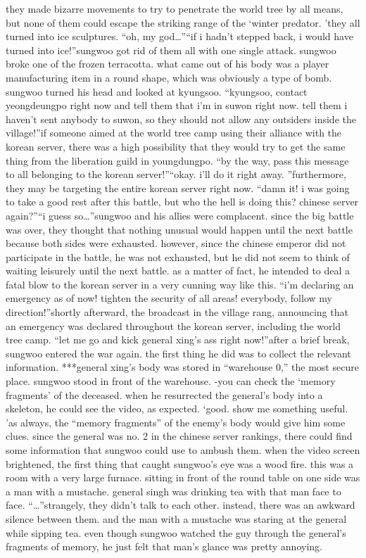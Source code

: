 they made bizarre movements to try to penetrate the world tree by all means, but none of them could escape the striking range of the ‘winter predator.
’they all turned into ice sculptures.
“oh, my god…”“if i hadn’t stepped back, i would have turned into ice!”sungwoo got rid of them all with one single attack.
sungwoo broke one of the frozen terracotta.
 what came out of his body was a player manufacturing item in a round shape, which was obviously a type of bomb.
sungwoo turned his head and looked at kyungsoo.
“kyungsoo, contact yeongdeungpo right now and tell them that i’m in suwon right now.
 tell them i haven’t sent anybody to suwon, so they should not allow any outsiders inside the village!”if someone aimed at the world tree camp using their alliance with the korean server, there was a high possibility that they would try to get the same thing from the liberation guild in youngdungpo.
“by the way, pass this message to all belonging to the korean server!”“okay.
 i’ll do it right away.
”furthermore, they may be targeting the entire korean server right now.
“damn it! i was going to take a good rest after this battle, but who the hell is doing this? chinese server again?”“i guess so…”sungwoo and his allies were complacent.
 since the big battle was over, they thought that nothing unusual would happen until the next battle because both sides were exhausted.
however, since the chinese emperor did not participate in the battle, he was not exhausted, but he did not seem to think of waiting leisurely until the next battle.
as a matter of fact, he intended to deal a fatal blow to the korean server in a very cunning way like this.
“i’m declaring an emergency as of now! tighten the security of all areas! everybody, follow my direction!”shortly afterward, the broadcast in the village rang, announcing that an emergency was declared throughout the korean server, including the world tree camp.
“let me go and kick general xing’s ass right now!”after a brief break, sungwoo entered the war again.
 the first thing he did was to collect the relevant information.
***general xing’s body was stored in “warehouse 0,” the most secure place.
sungwoo stood in front of the warehouse.
-you can check the ‘memory fragments’ of the deceased.
when he resurrected the general’s body into a skeleton, he could see the video, as expected.
‘good.
 show me something useful.
’as always, the “memory fragments” of the enemy’s body would give him some clues.
since the general was no.
 2 in the chinese server rankings, there could find some information that sungwoo could use to ambush them.
when the video screen brightened, the first thing that caught sungwoo’s eye was a wood fire.
 this was a room with a very large furnace.
 sitting in front of the round table on one side was a man with a mustache.
 general singh was drinking tea with that man face to face.
“…”strangely, they didn’t talk to each other.
 instead, there was an awkward silence between them.
and the man with a mustache was staring at the general while sipping tea.
 even though sungwoo watched the guy through the general’s fragments of memory, he just felt that man’s glance was pretty annoying.


